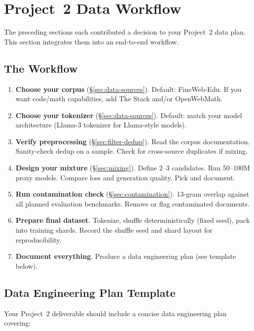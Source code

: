 \section{Project~2 Data Workflow}
\label{sec:data-workflow}

The preceding sections each contributed a decision to your Project~2 data plan. This section integrates them into an end-to-end workflow.

\subsection{The Workflow}

\begin{enumerate}
  \item \textbf{Choose your corpus} (\S\ref{sec:data-sources}). Default: FineWeb-Edu. If you want code/math capabilities, add The Stack and/or OpenWebMath.
  \item \textbf{Choose your tokenizer} (\S\ref{sec:data-sources}). Default: match your model architecture (Llama-3 tokenizer for Llama-style models).
  \item \textbf{Verify preprocessing} (\S\ref{sec:filter-dedup}). Read the corpus documentation. Sanity-check dedup on a sample. Check for cross-source duplicates if mixing.
  \item \textbf{Design your mixture} (\S\ref{sec:mixing}). Define 2--3 candidates. Run 50--100M proxy models. Compare loss and generation quality. Pick and document.
  \item \textbf{Run contamination check} (\S\ref{sec:contamination}). 13-gram overlap against all planned evaluation benchmarks. Remove or flag contaminated documents.
  \item \textbf{Prepare final dataset}. Tokenize, shuffle deterministically (fixed seed), pack into training shards. Record the shuffle seed and shard layout for reproducibility.
  \item \textbf{Document everything}. Produce a data engineering plan (see template below).
\end{enumerate}

\subsection{Data Engineering Plan Template}

Your Project~2 deliverable should include a concise data engineering plan covering:

